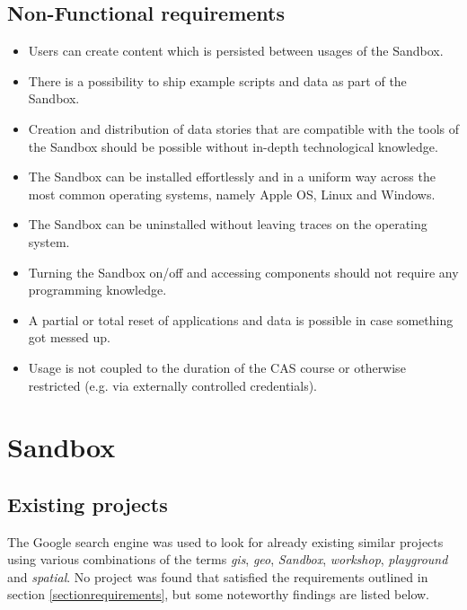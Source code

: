 \documentclass[11pt, a4paper, oneside, parskip=full-]{scrartcl}
\begin{document}
\subsection{Non-Functional requirements}
\begin{itemize}
  \item Users can create content which is persisted between usages of the
  Sandbox.
  \item There is a possibility to ship example scripts and data as part of the
  Sandbox.
  \item Creation and distribution of data stories that are compatible with the
  tools of the Sandbox should be possible without in-depth technological
  knowledge.
  \item The Sandbox can be installed effortlessly and in a uniform way across
  the most common operating systems, namely Apple OS, Linux and Windows.
  \item The Sandbox can be uninstalled without leaving traces on the operating
  system.
  \item Turning the Sandbox on/off and accessing components should not require
  any programming knowledge.
  \item A partial or total reset of applications and data is possible in case
  something got messed up.
  \item Usage is not coupled to the duration of the CAS course or otherwise
  restricted (e.g. via externally controlled credentials).
\end{itemize}

\section{Sandbox}

\subsection{Existing projects}
The Google search engine was used to look for already existing similar projects
using various combinations of the terms \emph{gis}, \emph{geo}, \emph{Sandbox},
\emph{workshop}, \emph{playground} and \emph{spatial}. No project was found that
satisfied the requirements outlined in section \ref{sectionrequirements}, but
some noteworthy findings are listed below.
\end{document}
